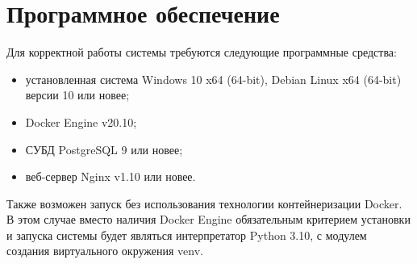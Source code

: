 \documentclass[../nirs.tex]{subfiles}
\begin{document}
    \section{Программное обеспечение}
    Для корректной работы системы требуются следующие программные средства:

    \begin{itemize}
        \item установленная система Windows 10 x64 (64-bit),
            Debian Linux x64 (64-bit) версии 10 или новее;
        \item Docker Engine v20.10;
        \item СУБД PostgreSQL 9 или новее;
        \item веб-сервер Nginx v1.10 или новее.
    \end{itemize}

    Также возможен запуск без использования технологии контейнеризации Docker.
    В этом случае вместо наличия Docker Engine обязательным критерием установки
    и запуска системы будет являться интерпретатор Python 3.10, с модулем
    создания виртуального окружения venv.
\end{document}
